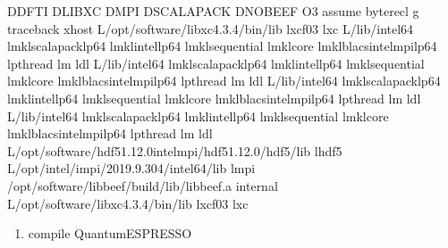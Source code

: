 \documentclass[a4paper,12pt,english]{sphinxmanual}
\begin{document}
\begin{sphinxVerbatim}[commandchars=\\\{\}]
             \PYGZhy{}D\PYGZus{}\PYGZus{}DFTI \PYGZhy{}D\PYGZus{}\PYGZus{}LIBXC \PYGZhy{}D\PYGZus{}\PYGZus{}MPI \PYGZhy{}D\PYGZus{}\PYGZus{}SCALAPACK \PYGZhy{}D\PYGZus{}\PYGZus{}NOBEEF
           \PYGZhy{}O3 \PYGZhy{}assume byterecl \PYGZhy{}g \PYGZhy{}traceback \PYGZhy{}xhost
          \PYGZhy{}L/opt/software/libxc\PYGZhy{}4.3.4/bin/lib \PYGZhy{}lxcf03 \PYGZhy{}lxc
          \PYGZhy{}L/lib/intel64 \PYGZhy{}lmkl\PYGZus{}scalapack\PYGZus{}lp64 \PYGZhy{}lmkl\PYGZus{}intel\PYGZus{}lp64 \PYGZhy{}lmkl\PYGZus{}sequential \PYGZhy{}lmkl\PYGZus{}core \PYGZhy{}lmkl\PYGZus{}blacs\PYGZus{}intelmpi\PYGZus{}lp64 \PYGZhy{}lpthread \PYGZhy{}lm \PYGZhy{}ldl
      \PYGZhy{}L/lib/intel64 \PYGZhy{}lmkl\PYGZus{}scalapack\PYGZus{}lp64 \PYGZhy{}lmkl\PYGZus{}intel\PYGZus{}lp64 \PYGZhy{}lmkl\PYGZus{}sequential \PYGZhy{}lmkl\PYGZus{}core \PYGZhy{}lmkl\PYGZus{}blacs\PYGZus{}intelmpi\PYGZus{}lp64 \PYGZhy{}lpthread \PYGZhy{}lm \PYGZhy{}ldl
   \PYGZhy{}L/lib/intel64 \PYGZhy{}lmkl\PYGZus{}scalapack\PYGZus{}lp64 \PYGZhy{}lmkl\PYGZus{}intel\PYGZus{}lp64 \PYGZhy{}lmkl\PYGZus{}sequential \PYGZhy{}lmkl\PYGZus{}core \PYGZhy{}lmkl\PYGZus{}blacs\PYGZus{}intelmpi\PYGZus{}lp64 \PYGZhy{}lpthread \PYGZhy{}lm \PYGZhy{}ldl
         \PYGZhy{}L/lib/intel64 \PYGZhy{}lmkl\PYGZus{}scalapack\PYGZus{}lp64 \PYGZhy{}lmkl\PYGZus{}intel\PYGZus{}lp64 \PYGZhy{}lmkl\PYGZus{}sequential \PYGZhy{}lmkl\PYGZus{}core \PYGZhy{}lmkl\PYGZus{}blacs\PYGZus{}intelmpi\PYGZus{}lp64 \PYGZhy{}lpthread \PYGZhy{}lm \PYGZhy{}ldl
   \PYGZhy{}L/opt/software/hdf5\PYGZhy{}1.12.0\PYGZus{}intelmpi/hdf5\PYGZhy{}1.12.0/hdf5/lib \PYGZhy{}lhdf5
         \PYGZhy{}L/opt/intel/impi/2019.9.304/intel64/lib \PYGZhy{}lmpi
        /opt/software/libbeef/build/lib/libbeef.a
   internal
       \PYGZhy{}L/opt/software/libxc\PYGZhy{}4.3.4/bin/lib \PYGZhy{}lxcf03 \PYGZhy{}lxc
\end{sphinxVerbatim}
\begin{enumerate}
%
\setcounter{enumi}{3}
\item {} 
\sphinxAtStartPar
compile Quantum\sphinxhyphen{}ESPRESSO

\end{enumerate}
\end{document}
